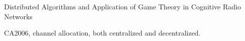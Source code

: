 Distributed Algorithms and Application of Game Theory in Cognitive Radio Networks

CA2006, channel allocation, both centralized and decentralized.

